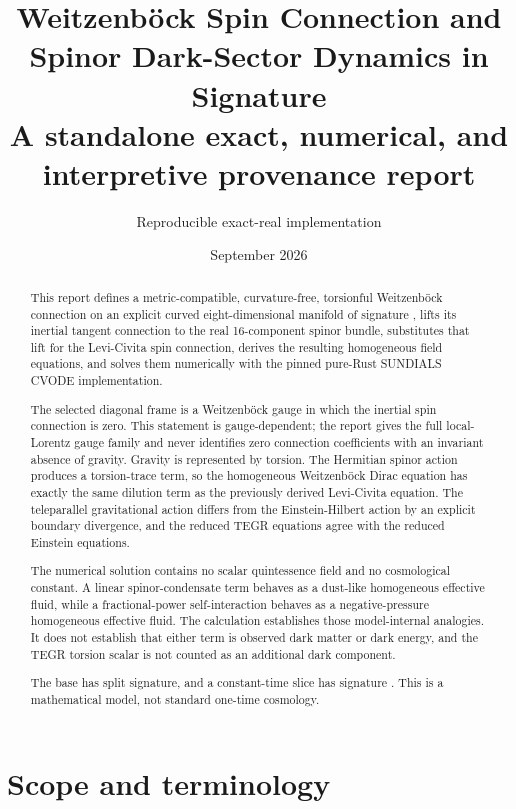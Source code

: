 \documentclass[11pt]{article}
\title{Weitzenböck Spin Connection and Spinor Dark-Sector Dynamics in Signature \texttt{\detokenize{(4,4)}}\\[0.5em]\large A standalone exact, numerical, and interpretive provenance report}
\author{Reproducible exact-real implementation}
\date{September 2026}
\begin{document}
\maketitle
\tableofcontents
\newpage
\begin{abstract}
This report defines a metric-compatible, curvature-free, torsionful Weitzenböck connection on an explicit curved eight-dimensional manifold of signature \texttt{}, lifts its inertial tangent connection to the real 16-component \texttt{} spinor bundle, substitutes that lift for the Levi-Civita spin connection, derives the resulting homogeneous field equations, and solves them numerically with the pinned pure-Rust SUNDIALS CVODE implementation.

The selected diagonal frame is a Weitzenböck gauge in which the inertial spin connection is zero. This statement is gauge-dependent; the report gives the full local-Lorentz gauge family and never identifies zero connection coefficients with an invariant absence of gravity. Gravity is represented by torsion. The Hermitian spinor action produces a torsion-trace term, so the homogeneous Weitzenböck Dirac equation has exactly the same \texttt{} dilution term as the previously derived Levi-Civita equation. The teleparallel gravitational action differs from the Einstein-Hilbert action by an explicit boundary divergence, and the reduced TEGR equations agree with the reduced Einstein equations.

The numerical solution contains no scalar quintessence field and no cosmological constant. A linear spinor-condensate term behaves as a dust-like homogeneous effective fluid, while a fractional-power self-interaction behaves as a negative-pressure homogeneous effective fluid. The calculation establishes those model-internal analogies. It does not establish that either term is observed dark matter or dark energy, and the TEGR torsion scalar is not counted as an additional dark component.

The base has split signature, and a constant-time slice has signature \texttt{}. This is a mathematical model, not standard one-time cosmology.

\end{abstract}

\section{Scope and terminology}
\end{document}
